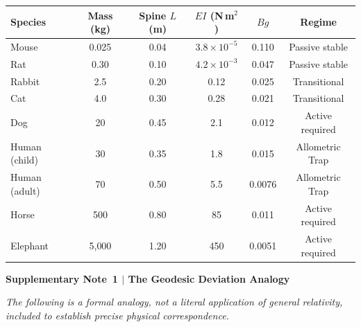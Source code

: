 \documentclass[12pt]{article}
\begin{document}
\begin{landscape}
\vspace{0.5em}
\begin{center}
\renewcommand{\arraystretch}{1.3}
{\footnotesize
\begin{tabular}{lccccc}
\toprule
\textbf{Species} & \textbf{Mass (kg)} & \textbf{Spine $L$ (m)} & \textbf{$EI$ (N\,m$^2$)} & \textbf{$Bg$} & \textbf{Regime} \\
\midrule
Mouse & 0.025 & 0.04 & $3.8 \times 10^{-5}$ & 0.110 & Passive stable \\
Rat & 0.30 & 0.10 & $4.2 \times 10^{-3}$ & 0.047 & Passive stable \\
Rabbit & 2.5 & 0.20 & 0.12 & 0.025 & Transitional \\
Cat & 4.0 & 0.30 & 0.28 & 0.021 & Transitional \\
Dog & 20 & 0.45 & 2.1 & 0.012 & Active required \\
Human (child) & 30 & 0.35 & 1.8 & 0.015 & Allometric Trap \\
Human (adult) & 70 & 0.50 & 5.5 & 0.0076 & Allometric Trap \\
Horse & 500 & 0.80 & 85 & 0.011 & Active required \\
Elephant & 5{,}000 & 1.20 & 450 & 0.0051 & Active required \\
\bottomrule
\end{tabular}}
\end{center}

\vspace{0.5em}

\end{landscape}

\clearpage
\noindent\textbf{Supplementary Note~1 $\mid$ The Geodesic Deviation Analogy}

\vspace{0.5em}
\noindent\textit{The following is a formal analogy, not a literal application of general relativity, included to establish precise physical correspondence.}
\end{document}
